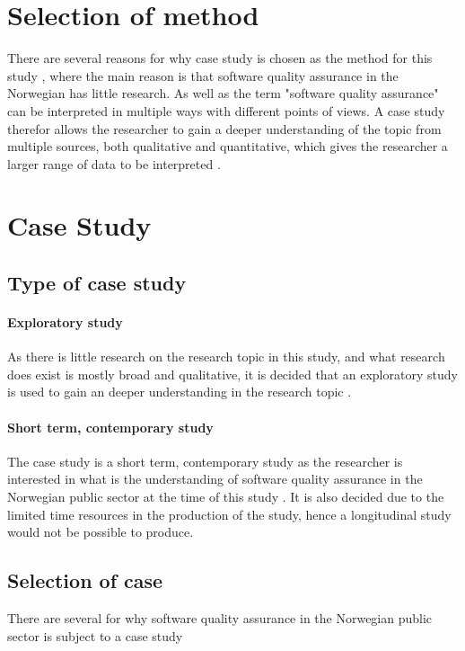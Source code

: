 \section{Selection of method}
There are several reasons for why case study is chosen as the method for this study \cite{bjo_2022}, where the main reason is that software quality assurance in the Norwegian has little research. As well as the term "software quality assurance" can be interpreted in multiple ways with different points of views. A case study therefor allows the researcher to gain a deeper understanding of the topic from multiple sources, both qualitative and quantitative, which gives the researcher a larger range of data to be interpreted \cite{bjo_2022}.

\section{Case Study}

\subsection{Type of case study}
\paragraph{Exploratory study}
As there is little research on the research topic in this study, and what research does exist is mostly broad and qualitative, it is decided that an exploratory study is used to gain an deeper understanding in the research topic \cite{bjo_2022}.

\paragraph{Short term, contemporary study} 
The case study is a short term, contemporary study as the researcher is interested in what is the understanding of software quality assurance in the Norwegian public sector at the time of this study \cite{bjo_2022}. It is also decided due to the limited time resources in the production of the study, hence a longitudinal study would not be possible to produce.

\subsection{Selection of case}
There are several for why software quality assurance in the Norwegian public sector is subject to a case study

